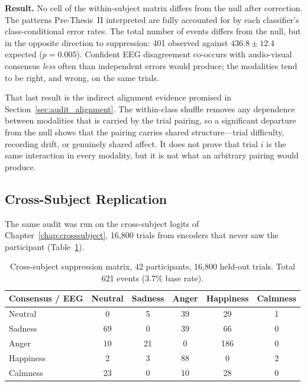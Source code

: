 \textbf{Result.} No cell of the within-subject matrix differs from the null after
correction. The patterns Pre-Thesis~II interpreted are fully accounted for by each
classifier's class-conditional error rates. The total number of events differs from
the null, but in the opposite direction to suppression: 401 observed against
$436.8 \pm 12.4$ expected ($p = 0.005$). Confident EEG disagreement co-occurs with
audio-visual consensus \emph{less} often than independent errors would produce; the
modalities tend to be right, and wrong, on the same trials.

That last result is the indirect alignment evidence promised in
Section~\ref{sec:audit_alignment}. The within-class shuffle removes any dependence
between modalities that is carried by the trial pairing, so a significant departure
from the null shows that the pairing carries shared structure---trial difficulty,
recording drift, or genuinely shared affect. It does not prove that trial $i$ is the
same interaction in every modality, but it is not what an arbitrary pairing would
produce.

\subsection{Cross-Subject Replication}

The same audit was run on the cross-subject logits of Chapter~\ref{chap:crosssubject},
16{,}800 trials from encoders that never saw the participant
(Table~\ref{tab:audit_cross}).

\begin{table}[htbp]
\centering
\small
\caption{Cross-subject suppression matrix, 42 participants, 16{,}800 held-out trials.
Total 621 events (3.7\% base rate).}
\label{tab:audit_cross}
\begin{tabular}{l c c c c c}
\hline
\textbf{Consensus / EEG} & \textbf{Neutral} & \textbf{Sadness} & \textbf{Anger} & \textbf{Happiness} & \textbf{Calmness} \\
\hline
Neutral   & 0  & 5  & 39  & 29  & 1 \\
Sadness   & 69 & 0  & 39  & 66  & 0 \\
Anger     & 10 & 21 & 0   & 186 & 0 \\
Happiness & 2  & 3  & 88  & 0   & 2 \\
Calmness  & 23 & 0  & 10  & 28  & 0 \\
\hline
\end{tabular}
\end{table}

